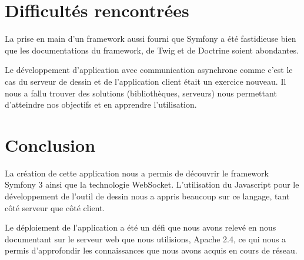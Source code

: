 \documentclass[a4paper]{article}
\begin{document}
\section{Difficultés rencontrées}
La prise en main d'un framework aussi fourni que Symfony a été fastidieuse bien que les documentations du framework, de Twig et de Doctrine soient abondantes.

Le développement d'application avec communication asynchrone comme c'est le cas du serveur de dessin et de l'application client était un exercice nouveau. Il nous a fallu trouver des solutions (bibliothèques, serveurs) nous permettant d'atteindre nos objectifs et en apprendre l'utilisation.

\section{Conclusion}
La création de cette application nous a permis de découvrir le framework Symfony 3 ainsi que la technologie \cite{WebSockets}WebSocket. L'utilisation du Javascript pour le développement de l'outil de dessin nous a appris beaucoup sur ce langage, tant côté serveur que côté client.

Le déploiement de l'application a été un défi que nous avons relevé en nous documentant sur le serveur web que nous utilisions, Apache 2.4, ce qui nous a permis d'approfondir les connaissances que nous avons acquis en cours de réseau.
\newpage


\end{document}
